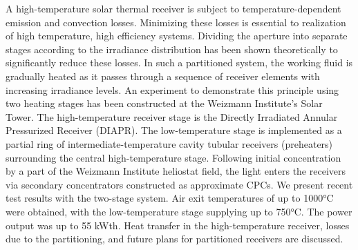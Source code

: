 A high-temperature solar thermal receiver is subject to temperature-dependent emission and convection losses. Minimizing these losses is essential to realization of high temperature, high efficiency systems. Dividing the aperture into separate stages according to the irradiance distribution has been shown theoretically to significantly reduce these losses. In such a partitioned system, the working fluid is gradually heated as it passes through a sequence of receiver elements with increasing irradiance levels. An experiment to demonstrate this principle using two heating stages has been constructed at the Weizmann Institute’s Solar Tower. The high-temperature receiver stage is the Directly Irradiated Annular Pressurized Receiver (DIAPR). The low-temperature stage is implemented as a partial ring of intermediate-temperature cavity tubular receivers (preheaters) surrounding the central high-temperature stage. Following initial concentration by a part of the Weizmann Institute heliostat field, the light enters the receivers via secondary concentrators constructed as approximate CPCs. We present recent test results with the two-stage system. Air exit temperatures of up to 1000°C were obtained, with the low-temperature stage supplying up to 750°C. The power output was up to 55 kWth. Heat transfer in the high-temperature receiver, losses due to the partitioning, and future plans for partitioned receivers are discussed.

